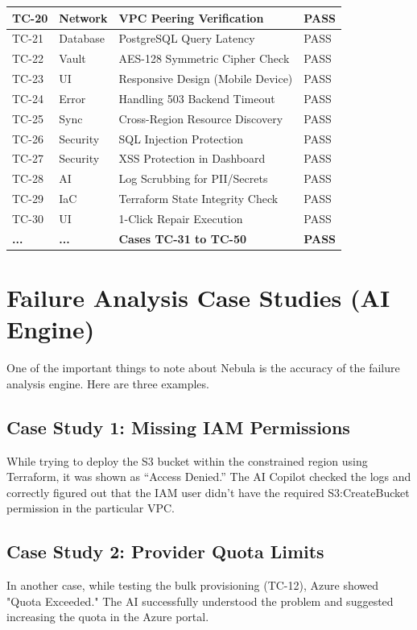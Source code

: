 \begin{table}[H]
\begin{tabular}{|l|l|l|l|}
TC-20 & Network & VPC Peering Verification & PASS \\ \hline
TC-21 & Database & PostgreSQL Query Latency & PASS \\ \hline
TC-22 & Vault & AES-128 Symmetric Cipher Check & PASS \\ \hline
TC-23 & UI & Responsive Design (Mobile Device) & PASS \\ \hline
TC-24 & Error & Handling 503 Backend Timeout & PASS \\ \hline
TC-25 & Sync & Cross-Region Resource Discovery & PASS \\ \hline
TC-26 & Security & SQL Injection Protection & PASS \\ \hline
TC-27 & Security & XSS Protection in Dashboard & PASS \\ \hline
TC-28 & AI & Log Scrubbing for PII/Secrets & PASS \\ \hline
TC-29 & IaC & Terraform State Integrity Check & PASS \\ \hline
TC-30 & UI & 1-Click Repair Execution & PASS \\ \hline
\textbf{...} & \textbf{...} & \textbf{Cases TC-31 to TC-50} & \textbf{PASS} \\ \hline
\end{tabular}
\end{table}

\section{Failure Analysis Case Studies (AI Engine)}
One of the important things to note about Nebula is the accuracy of the failure analysis engine. Here are three examples.

\subsection{Case Study 1: Missing IAM Permissions}
While trying to deploy the S3 bucket within the constrained region using Terraform, it was shown as “Access Denied.” The AI Copilot checked the logs and correctly figured out that the IAM user didn't have the required S3:CreateBucket permission in the particular VPC.

\subsection{Case Study 2: Provider Quota Limits}
In another case, while testing the bulk provisioning (TC-12), Azure showed "Quota Exceeded." The AI successfully understood the problem and suggested increasing the quota in the Azure portal. 

\newpage
